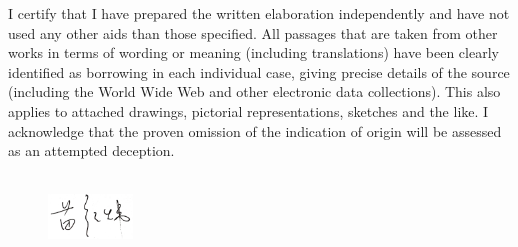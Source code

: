 \clearpage %

\noindent

I certify that I have prepared the written elaboration independently and have not used any other aids than those specified. All passages that are taken from other works in terms of wording or meaning (including translations) have been clearly identified as borrowing in each individual case, giving precise details of the source (including the World Wide Web and other electronic data collections). This also applies to attached drawings, pictorial representations, sketches and the like. I acknowledge that the proven omission of the indication of origin will be assessed as an attempted deception. 
\\
\\

\begin{figure}[h]
    \raggedright
    \includegraphics[width=0.2\textwidth]{Images/signature.jpg}
\end{figure}